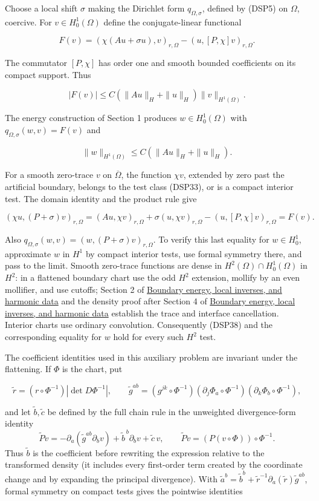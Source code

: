 \documentclass[
  11pt,
]{article}
\begin{document}
Choose a local shift \(\sigma\) making the Dirichlet form
\(q_{\Omega,\sigma}\), defined by (DSP5) on \(\Omega\), coercive. For
\(v\in H_0^1(\Omega)\) define the conjugate-linear functional

\[
 F(v)=(\chi(Au+\sigma u),v)_{r,\Omega}
 -(u,[P,\chi]v)_{r,\Omega}.
 \tag{DSP36}
\]

The commutator \([P,\chi]\) has order one and smooth bounded
coefficients on its compact support. Thus

\[
 |F(v)|\leq C(\|Au\|_H+\|u\|_H)\|v\|_{H^1(\Omega)}.
\]

The energy construction of Section 1 produces \(w\in H_0^1(\Omega)\)
with \(q_{\Omega,\sigma}(w,v)=F(v)\) and

\[
 \|w\|_{H^1(\Omega)}\leq C(\|Au\|_H+\|u\|_H).
 \tag{DSP37}
\]

For a smooth zero-trace \(v\) on \(\overline\Omega\), the function
\(\chi v\), extended by zero past the artificial boundary, belongs to
the test class (DSP33), or is a compact interior test. The domain
identity and the product rule give

\[
 (\chi u,(P+\sigma)v)_{r,\Omega}
 =(Au,\chi v)_{r,\Omega}+\sigma(u,\chi v)_{r,\Omega}
 -(u,[P,\chi]v)_{r,\Omega}=F(v).
 \tag{DSP38}
\]

Also \(q_{\Omega,\sigma}(w,v)=(w,(P+\sigma)v)_{r,\Omega}\). To verify
this last equality for \(w\in H_0^1\), approximate \(w\) in \(H^1\) by
compact interior tests, use formal symmetry there, and pass to the
limit. Smooth zero-trace functions are dense in
\(H^2(\Omega)\cap H_0^1(\Omega)\) in \(H^2\): in a flattened boundary
chart use the odd \(H^2\) extension, mollify by an even mollifier, and
use cutoffs; Section 2 of \href{second-order-boundary.pdf}{Boundary
energy, local inverses, and harmonic data} and the density proof after
Section 4 of \href{second-order-boundary.pdf}{Boundary energy, local
inverses, and harmonic data} establish the trace and interface
cancellation. Interior charts use ordinary convolution. Consequently
(DSP38) and the corresponding equality for \(w\) hold for every such
\(H^2\) test.

The coefficient identities used in this auxiliary problem are invariant
under the flattening. If \(\Phi\) is the chart, put

\[
 \widetilde r=(r\circ\Phi^{-1})|\det D\Phi^{-1}|,\qquad
 \widetilde g^{ab}=(g^{jk}\circ\Phi^{-1})
 (\partial_j\Phi_a\circ\Phi^{-1})(\partial_k\Phi_b\circ\Phi^{-1}),
\]

and let \(\widetilde b,\widetilde c\) be defined by the full chain rule
in the unweighted divergence-form identity \[
 \widetilde P v=-\partial_a(\widetilde g^{ab}\partial_bv)
 +\widetilde b^{\,b}\partial_bv+\widetilde c\,v,
 \qquad \widetilde P v=(P(v\circ\Phi))\circ\Phi^{-1}.
\] Thus \(\widetilde b\) is the coefficient before rewriting the
expression relative to the transformed density (it includes every
first-order term created by the coordinate change and by expanding the
principal divergence). With
\(\widetilde a^b=\widetilde b^b+\widetilde r^{-1}
\partial_a(\widetilde r)\widetilde g^{ab}\), formal symmetry on compact
tests gives the pointwise identities
\end{document}
